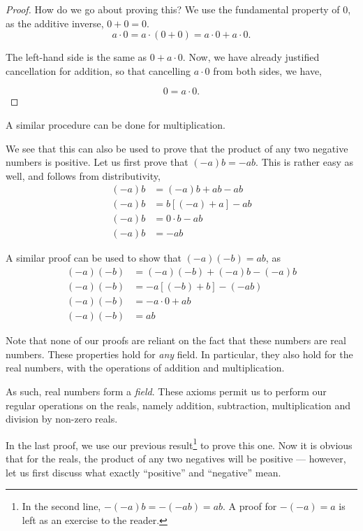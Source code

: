 \begin{proof}
    How do we go about proving this? We use the fundamental property of \(0\), as 
    the additive inverse, \(0 + 0 = 0\).
    \begin{equation*}
        a \cdot 0 = a \cdot (0 + 0) = a \cdot 0 + a \cdot 0.
    \end{equation*}

    The left-hand side is the same as \(0 + a \cdot 0\). Now, we have already justified 
    cancellation for addition, so that cancelling \(a \cdot 0\) from both sides, we have, 

    \begin{equation*}
        0 = a\cdot 0.
    \end{equation*}
\end{proof}

A similar procedure can be done for multiplication.

We see that this can also be used to prove that the product of any two negative numbers is 
positive. Let us first prove that \((-a)b = -ab\). This is rather easy as well, and follows 
from distributivity,
\begin{align*}
    (-a)b &= (-a)b + ab - ab \\
    (-a)b &= b[(-a) + a] - ab \\
    (-a)b & = 0 \cdot b - ab\\
    (-a)b &= -ab
\end{align*}

A similar proof can be used to show that \((-a)(-b) = ab\), as 
\begin{align*}
    (-a)(-b) &= (-a)(-b) + (-a)b - (-a)b \\
    (-a)(-b) &= -a[(-b) + b] - (-ab) \\
    (-a)(-b) &= -a \cdot 0 + ab\\
    (-a)(-b) &= ab
\end{align*}

Note that none of our proofs are reliant on the fact that these numbers are 
real numbers. These properties hold for \emph{any} field. In particular, 
they also hold for the real numbers, with the operations of addition and multiplication.

As such, real numbers form a \emph{field}. These axioms permit us to perform our regular operations on 
the reals, namely addition, subtraction, multiplication and division by non-zero
reals.

In the last proof, we use our previous result\footnote{In the second line, \(-(-a)b = -(-ab) = ab\). A proof for \(-(-a) = a\) is left as 
an exercise to the reader.} to prove this one. Now it is obvious that for 
the reals, the product of any two negatives will be positive --- however, let us first discuss what exactly ``positive''
and ``negative'' mean.

